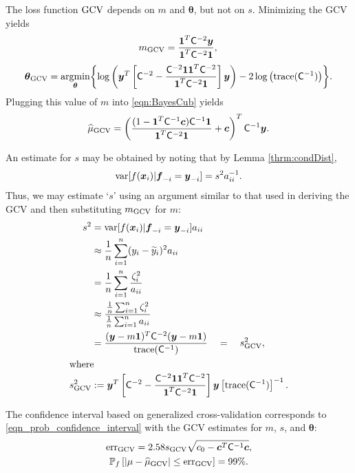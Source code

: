 \documentclass{iitthesis}          %
\newcommand{\bm}[1]{\boldsymbol{#1}}
\newcommand{\trace}[1]{\textup{trace}{#1}}
\newcommand{\vtheta}{{\bm{\theta}}}
\newcommand{\vc}{\bm{c}}
\newcommand{\vf}{\bm{f}}
\newcommand{\vx}{\bm{x}}
\newcommand{\vy}{\bm{y}}
\newcommand{\vone}{\bm{1}}
\newcommand{\mC}{\mathsf{C}}
\newcommand{\var}{{\textup{var}}}
\newcommand{\hmu}{\widehat{\mu}}
\newcommand{\err}{\textup{err}}
\providecommand{\argmin}{\operatorname*{argmin}}
\begin{document}
The loss function $\textup{GCV}$ depends on $m$ and $\vtheta$, but not on $s$.  Minimizing the GCV  yields
\begin{equation*}
m_{\textup{GCV}} = \frac{\vone^T \mC^{-2} \vy}{\vone^T \mC^{-2} \vone},\\ 
\end{equation*}
\begin{multline}
\label{vthetaGCV}
\vtheta_{\textup{GCV}} = \argmin_\vtheta \biggl\{\log \left(  \vy^T \left[\mC^{-2} - \frac{\mC^{-2} \vone \vone^T \mC^{-2}}{\vone^T \mC^{-2} \vone}  \right] \vy \right)  
- 2 \log \left ( \trace(\mC^{-1}) \right ) \biggr\} .
\end{multline}
Plugging this value of $m$ into \eqref{eqn:BayesCub} yields
\begin{equation}
\label{eqn:muCV}
\widehat{\mu}_{\textup{GCV}}
= \left(\frac{(1 - \vone^T  \mC^{-1}\vc) \mC^{-1} \vone}{\vone^T \mC^{-2} \vone} + \vc \right)^T \mC^{-1} \vy.
\end{equation}

An estimate for $s$ may be obtained by noting that by Lemma \ref{thrm:condDist},
\begin{align*}
\var[f(\vx_i ) | \vf_{-i} = \vy_{-i}] = s^2 a_{ii}^{-1}.
\end{align*}
Thus, we may estimate `$s$' using an argument similar to that used in deriving the GCV and then substituting $m_{\textup{GCV}}$ for $m$:
\begin{align*}
s^2 &= \var[f(\vx_i ) | \vf_{-i} = \vy_{-i}] a_{ii} \\ 
& \approx \frac 1n \sum_{i=1}^n (y_i - \widetilde{y}_i)^2a_{ii} \\
& = \frac 1n \sum_{i=1}^n \frac{\zeta_i^2}{a_{ii}} \\ 
& \approx \frac{ \frac 1n \sum_{i=1}^n \zeta_i^2}{\frac 1n \sum_{i=1}^n a_{ii} } \\
& = \frac{(\vy - m\vone)^T \mC^{-2} (\vy - m \vone)}{ \trace(\mC^{-1}) } \quad = \quad s^2_{\textup{GCV}}, \\
 \intertext{where}
 s^2_{\textup{GCV}} & : = \vy^T \left[\mC^{-2} - \frac{\mC^{-2} \vone \vone^T \mC^{-2}}{\vone^T \mC^{-2} \vone}  \right] \vy  \left[ \trace(\mC^{-1}) \right]^{-1}. 
\end{align*}

The confidence interval based on generalized cross-validation corresponds to \eqref{eqn_prob_confidence_interval} with the GCV estimates for $m$, $s$, and $\vtheta$:
\begin{gather}
\label{GCVerr}
\err_{\textup{GCV}} = 2.58 s_{\textup{GCV}}  \sqrt{c_0 - \vc^T\mC^{-1}\vc}, \\
\label{GCVCI}
\mathbb{P}_f \left[
|\mu-\hmu_{\textup{GCV}}| \leq \err_{\textup{GCV}} 
\right] = 99\%.
\end{gather}
\end{document}
